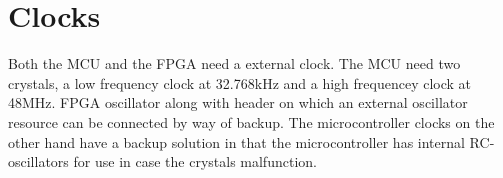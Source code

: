 \documentclass[../main/report.tex]{subfiles}
\begin{document}
\section{Clocks}
Both the MCU and the FPGA need a external clock. The MCU need two crystals, a low frequency clock at 32.768kHz and a high frequencey clock at 48MHz. 
FPGA oscillator along with header on which an external oscillator resource can be connected by way of backup.
The microcontroller clocks on the other hand have a backup solution in that the microcontroller has internal RC-oscillators for use in case the crystals malfunction.
\end{document}
